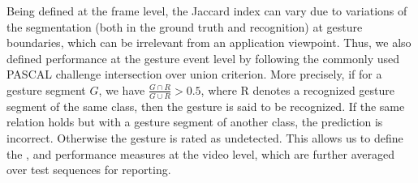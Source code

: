 Being defined at the frame level, the Jaccard index can vary due to variations of the segmentation (both in the ground truth and recognition)
at gesture boundaries, which can be irrelevant from an application viewpoint.
%
Thus, we also defined performance at the gesture event level by following the commonly used PASCAL challenge intersection over union criterion.
More precisely, if for a gesture segment $G$, we have $\frac{G \cap R}{G \cup R} >  0.5$, where R denotes a recognized gesture
segment of the same class, then the  gesture is said to be recognized.
%
If the same relation holds but with a gesture segment of another class, the prediction is incorrect.
Otherwise the gesture is rated as undetected. This allows us to define the \eventaccuracy, \eventconfused and \eventmissed performance measures at the video level,
which are further averaged over test sequences for reporting.


